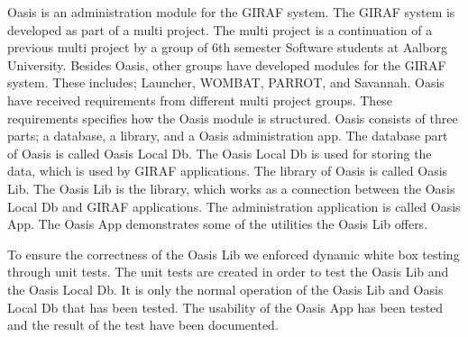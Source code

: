 Oasis is an administration module for the GIRAF system. The GIRAF system is developed as part of a multi project. The multi project is a continuation of a previous multi project by a group of 6th semester Software students at Aalborg University. Besides Oasis, other groups have developed modules for the GIRAF system. These includes; Launcher, WOMBAT, PARROT, and Savannah. Oasis have received requirements from different multi project groups. These requirements specifies how the Oasis module is structured. Oasis consists of three parts; a database, a library, and a Oasis administration app. The database part of Oasis is called Oasis Local Db. The Oasis Local Db is used for storing the data, which is used by GIRAF applications. The library of Oasis is called Oasis Lib. The Oasis Lib is the library, which works as a connection between the Oasis Local Db and GIRAF applications. The administration application is called Oasis App. The Oasis App demonstrates some of the utilities the Oasis Lib offers.

To ensure the correctness of the Oasis Lib we enforced dynamic white box testing through unit tests. The unit tests are created in order to test the Oasis Lib and the Oasis Local Db. It is only the normal operation of the Oasis Lib and Oasis Local Db that has been tested. 
The usability of the Oasis App has been tested and the result of the test have been documented.